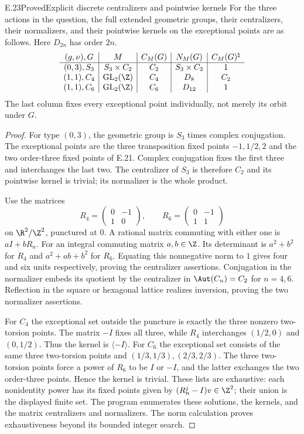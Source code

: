 \begin{claim}{E.23}{Proved}{Explicit discrete centralizers and pointwise kernels}
For the three actions in the question, the full extended geometric groups, their centralizers, their normalizers, and their pointwise kernels on the exceptional points are as follows. Here $D_{2n}$ has order $2n$.
\[
\begin{array}{c|c|c|c|c}
 (g,\nu),G&M&C_M(G)&N_M(G)&C_M(G)^{\natural}\\ \hline
 (0,3),S_3&S_3\times C_2&C_2&S_3\times C_2&1\\
 (1,1),C_4&\mathrm{GL}_2(\Z)&C_4&D_8&C_2\\
 (1,1),C_6&\mathrm{GL}_2(\Z)&C_6&D_{12}&1
\end{array}
\]
The last column fixes every exceptional point individually, not merely its orbit under $G$.
\end{claim}
\begin{proof}
For type $(0,3)$, the geometric group is $S_3$ times complex conjugation. The exceptional points are the three transposition fixed points $-1,1/2,2$ and the two order-three fixed points of E.21. Complex conjugation fixes the first three and interchanges the last two. The centralizer of $S_3$ is therefore $C_2$ and its pointwise kernel is trivial; its normalizer is the whole product.

Use the matrices
\[
 R_4=\begin{pmatrix}0&-1\\1&0\end{pmatrix},\qquad
 R_6=\begin{pmatrix}0&-1\\1&1\end{pmatrix}
\]
on $\R^2/\Z^2$, punctured at $0$. A rational matrix commuting with either one is $aI+bR_n$. For an integral commuting matrix $a,b\in\Z$. Its determinant is $a^2+b^2$ for $R_4$ and $a^2+ab+b^2$ for $R_6$. Equating this nonnegative norm to $1$ gives four and six units respectively, proving the centralizer assertions. Conjugation in the normalizer embeds its quotient by the centralizer in $\Aut(C_n)=C_2$ for $n=4,6$. Reflection in the square or hexagonal lattice realizes inversion, proving the two normalizer assertions.

For $C_4$ the exceptional set outside the puncture is exactly the three nonzero two-torsion points. The matrix $-I$ fixes all three, while $R_4$ interchanges $(1/2,0)$ and $(0,1/2)$. Thus the kernel is $\langle-I\rangle$. For $C_6$ the exceptional set consists of the same three two-torsion points and $(1/3,1/3),(2/3,2/3)$. The three two-torsion points force a power of $R_6$ to be $I$ or $-I$, and the latter exchanges the two order-three points. Hence the kernel is trivial. These lists are exhaustive: each nonidentity power has its fixed points given by $(R_n^j-I)v\in\Z^2$; their union is the displayed finite set. The program enumerates these solutions, the kernels, and the matrix centralizers and normalizers. The norm calculation proves exhaustiveness beyond its bounded integer search.
\end{proof}

